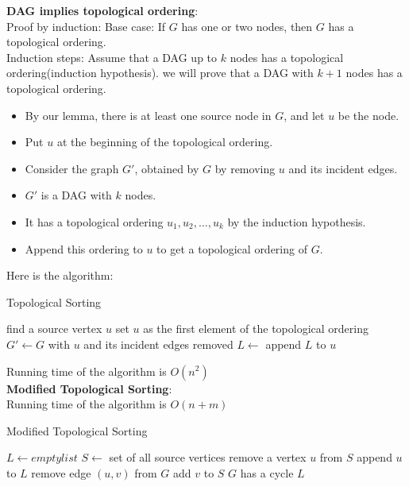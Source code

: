 \documentclass[onecolumn]{report}
\begin{document}
\noindent
\textbf{DAG implies topological ordering}:\\
Proof by induction:
Base case: If $G$ has one or two nodes, then $G$ has a topological ordering.\\
Induction steps: Assume that a DAG up to $k$ nodes has a topological ordering(induction hypothesis). we will prove that a DAG with $k+1$ nodes has a topological ordering.
\begin{itemize}
    \item By our lemma, there is at least one source node in $G$, and let $u$ be the node.
    \item Put $u$ at the beginning of the topological ordering.
    \item Consider the graph $G'$, obtained by $G$ by removing $u$ and its incident edges.
    \item $G'$ is a DAG with $k$ nodes.
    \item It has a topological ordering $u_1,u_2,\dots,u_k$ by the induction hypothesis.
    \item Append this ordering to $u$ to get a topological ordering of $G$.
\end{itemize}
\noindent
Here is the algorithm:\\
\begin{algorithm}[H]
\caption{Topological Sorting}
\begin{algorithmic}[1]
\State find a source vertex $u$
\State set $u$ as the first element of the topological ordering
\State $G' \gets G$ with $u$ and its incident edges removed
\State $L \gets$ 
\State append $L$ to $u$
\EndProcedure
\end{algorithmic}
\end{algorithm}
\noindent
Running time of the algorithm is $O(n^2)$\\
\textbf{Modified Topological Sorting}:\\
Running time of the algorithm is $O(n+m)$\\
\begin{algorithm}[H]
\caption{Modified Topological Sorting}
\begin{algorithmic}[1]
\State $L \gets empty list$
\State $S \gets$ set of all source vertices
\State remove a vertex $u$ from $S$
\State append $u$ to $L$
\State remove edge $(u,v)$ from $G$
\State add $v$ to $S$
\EndIf
\EndFor
\EndWhile
{}
\State \Return $G$ has a cycle
\Else
\State \Return $L$
\EndIf
\EndProcedure
\end{algorithmic}
\end{algorithm}
\end{document}

